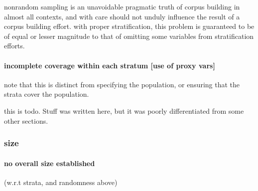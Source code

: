 nonrandom sampling is an unavoidable pragmatic truth of corpus building in almost all contexts, and with care should not unduly influence the result of a corpus building effort.  with proper stratification, this problem is guaranteed to be of equal or lesser magnitude to that of omitting some variables from stratification efforts.



\paragraph{ incomplete coverage within each stratum [use of proxy vars]}
note that this is distinct from specifying the population, or ensuring that the strata cover the population.

this is todo.  Stuff was written here, but it was poorly differentiated from some other sections.









\subsubsection{size}

\paragraph{ no overall size established }
(w.r.t strata, and randomness above)

